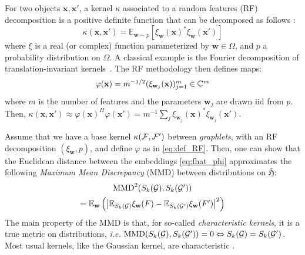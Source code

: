 \documentclass{article}
\begin{document}
For two objects $\mathbf{x}, \mathbf{x'}$, a kernel $\kappa$ associated to a random features (RF) decomposition is a positive definite function that can be decomposed  as follows \cite{rahimi2008random}:
\begin{equation}
\label{eq:RF_decomposition}
\kappa(\mathbf{x},\mathbf{x}')=\mathbb{E}_{\mathbf{w}\sim p}[ \xi_\mathbf{w}(\mathbf{x})^* \xi_\mathbf{w}(\mathbf{x}')]
\end{equation}
where $\xi$ is a real (or complex) function parameterized by $\mathbf{w} \in \Omega$, and $p$ a probability distribution on $\Omega$. A classical example is the Fourier decomposition of translation-invariant kernels~\cite{rahimi2008random}.
The RF methodology then defines maps:
\begin{equation}
	\label{eq:def_RF}
	\mathsmaller{
	\varphi(\mathbf{x}) = m^{-1/2} ( \xi_{\mathbf{w}_j}(\mathbf{x}) )_{j=1}^m \in \mathbb{C}^m}
\end{equation}
where $m$ is the number of features and the parameters $\mathbf{w}_j$ are drawn iid from $p$. Then, $\kappa(\mathbf{x},\mathbf{x}')\approx	\varphi(\mathbf{x})^H	\varphi(\mathbf{x}') = m^{-1} \sum_j \xi_{\mathbf{w}_j}(\mathbf{x})^* \xi_{\mathbf{w}_j}(\mathbf{x}')$. 

Assume that we have a base kernel $\kappa(\mathcal{F},\mathcal{F}')$ between \emph{graphlets}, with an RF decomposition $(\xi_\mathbf{w}, p)$, and define $\varphi$ as in \eqref{eq:def_RF}. Then, one can show \cite{Keriven2017a, Keriven2018} that the Euclidean distance between the embeddings \eqref{eq:fhat_phi} approximates the following \emph{Maximum Mean Discrepancy} (MMD) \cite{Gretton2007, Sriperumbudur2010} between distributions on $\bar{\mathfrak{H}}$:
 \begin{multline}\label{eq:MMD}
 \mathsmaller{
 \textup{MMD}^2(S_k(\G), S_k(\G'))} \\
 \mathsmaller{= \mathbb{E}_{\mathbf{w}} \left( \left| \mathbb{E}_{S_k(\G)} \xi_\mathbf{w}(F) - \mathbb{E}_{S_k(\G')} \xi_\mathbf{w}(F') \right|^2 \right)}
 \end{multline}
The main property of the MMD is that, for so-called \emph{characteristic kernels}, it is a true metric on distributions, \emph{i.e.} $\textup{MMD}(S_k(\mathcal{G}), S_k(\mathcal{G}')) = 0 \Leftrightarrow S_k(\mathcal{G}) = S_k(\mathcal{G}')$. %
Most usual kernels, like the Gaussian kernel, are characteristic \cite{Gretton2007, Sriperumbudur2010}.
%
\end{document}
